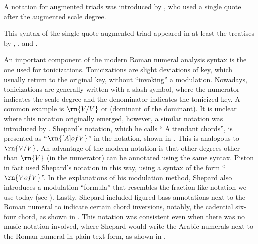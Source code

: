 
A notation for augmented triads was introduced by
\textcite{jadassohn1883lehrbuch}, who used a single quote
after the augmented scale degree.


This syntax of the single-quote augmented triad appeared in
at least the treatises by \textcite{broekhoven1889system},
\textcite{buwa1893schule}, and
\textcite{shepard1896harmony}.


An important component of the modern Roman numeral analysis
syntax is the one used for tonicizations. Tonicizations are
slight deviations of key, which usually return to the
original key, without ``invoking'' a modulation. Nowadays,
tonicizations are generally written with a slash symbol,
where the numerator indicates the scale degree and the
denominator indicates the tonicized key. A common example is
$\rn{V/V}$ or (dominant of the dominant). It is unclear
where this notation originally emerged, however, a similar
notation was introduced by \textcite{shepard1889how}.
Shepard's notation, which he calls ``[A]ttendant chords'',
is presented as ``$\rn{[A] of V}$'' in the notation, shown
in . This is
analogous to $\rn{V/V}$. An advantage of the modern notation
is that other degrees other than $\rn{V}$ (in the numerator)
can be annotated using the same syntax. Piston in fact used
Shepard's notation in this way, using a syntax of the form
``$\rn{V of V}$''. In the explanations of his modulation
method, Shepard also introduces a modulation ``formula''
that resembles the fraction-like notation we use today (see
). Lastly, Shepard
included figured bass annotations next to the Roman numeral
to indicate certain chord inversions, notably, the cadential
six-four chord, as shown in
. This
notation was consistent even when there was no music
notation involved, where Shepard would write the Arabic
numerals next to the Roman numeral in plain-text form, as
shown in .

